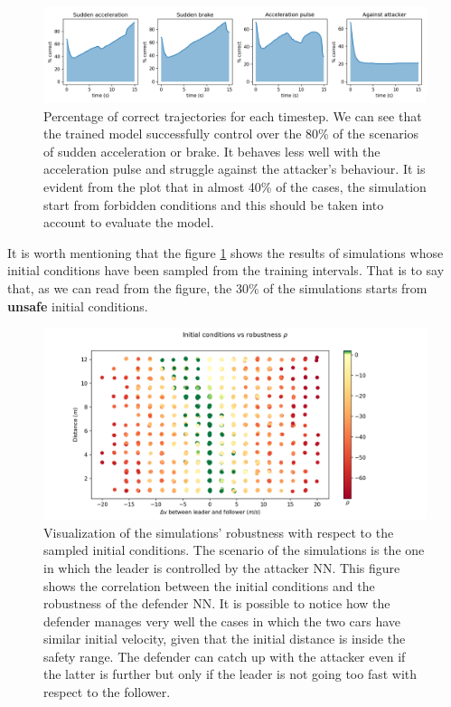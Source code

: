 \begin{figure}[H]
	\centering
	\includegraphics[width=13.8cm, keepaspectratio]{img/5_3_pct_histogram.png}
	\caption{Percentage of correct trajectories for each timestep. We can see that the trained model successfully control over the 80\% of the scenarios of sudden acceleration or brake. It behaves less well with the acceleration pulse and struggle against the attacker's behaviour. It is evident from the plot that in almost 40\% of the cases, the simulation start from forbidden conditions and this should be taken into account to evaluate the model.}
    \label{fig:pct_hist_single}
\end{figure}

It is worth mentioning that the figure \ref{fig:pct_hist_single} shows the results of simulations whose initial conditions have been sampled from the training intervals.
That is to say that, as we can read from the figure, the 30\% of the simulations starts from \textbf{unsafe} initial conditions.

\begin{figure}[H]
	\centering
	\includegraphics[width=14cm, keepaspectratio]{img/5_3_atk_scatterplot.png}
	\caption{Visualization of the simulations' robustness with respect to the sampled initial conditions. The scenario of the simulations is the one in which the leader is controlled by the attacker NN. This figure shows  the correlation between the initial conditions and the robustness of the defender NN. It is possible to notice how the defender manages very well the cases in which the two cars have similar initial velocity, given that the initial distance is inside the safety range. The  defender can catch up with the attacker even if the latter is further but only if the leader is not going too fast with respect to the follower.}
    \label{fig:atk_scatterplot}
\end{figure}


